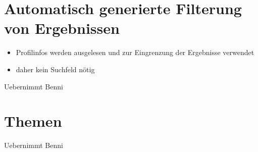 \section{Automatisch generierte Filterung von Ergebnissen}
\begin{k}
\begin{itemize}
  \item Profilinfos werden ausgelesen und zur Eingrenzung der Ergebnisse
  verwendet
  \item daher kein Suchfeld nötig
\end{itemize}

Uebernimmt Benni
\end{k}

\section{Themen}
\begin{k}
Uebernimmt Benni
\end{k}